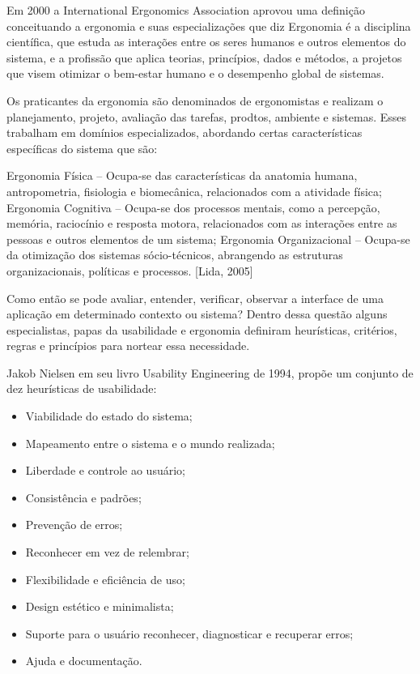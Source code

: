 Em 2000 a International Ergonomics Association aprovou uma definição conceituando a ergonomia e suas especializações que diz Ergonomia é a disciplina científica, que estuda as interações entre os seres humanos e outros elementos do sistema, e a profissão que aplica teorias, princípios, dados e métodos, a projetos que visem otimizar o bem-estar humano e o desempenho global de sistemas.

Os praticantes da ergonomia são denominados de ergonomistas e realizam o planejamento, projeto, avaliação das tarefas, prodtos, ambiente e sistemas. Esses trabalham em domínios especializados, abordando certas características específicas do sistema que são:

Ergonomia Física – Ocupa-se das características da anatomia humana, antropometria, fisiologia e biomecânica, relacionados com a atividade física;
Ergonomia Cognitiva – Ocupa-se dos processos mentais, como a percepção, memória, raciocínio e resposta motora, relacionados com as interações entre as pessoas e outros elementos de um sistema;
Ergonomia Organizacional – Ocupa-se da otimização dos sistemas sócio-técnicos, abrangendo as estruturas organizacionais, políticas e processos. [Lida, 2005]

Como então se pode avaliar, entender, verificar, observar a interface de uma aplicação em determinado contexto ou sistema? Dentro dessa questão alguns especialistas, papas da usabilidade e ergonomia definiram heurísticas, critérios, regras e princípios para nortear essa necessidade.

Jakob Nielsen em seu livro Usability Engineering de 1994, propõe um conjunto de dez heurísticas de usabilidade:
\begin{itemize} 
\item Viabilidade do estado do sistema;
\item Mapeamento entre o sistema e o mundo realizada;
\item Liberdade e controle ao usuário;
\item Consistência e padrões;
\item Prevenção de erros;
\item Reconhecer em vez de relembrar;
\item Flexibilidade e eficiência de uso;
\item Design estético e minimalista;
\item Suporte para o usuário reconhecer, diagnosticar e recuperar erros;
\item Ajuda e documentação.
\end{itemize}

